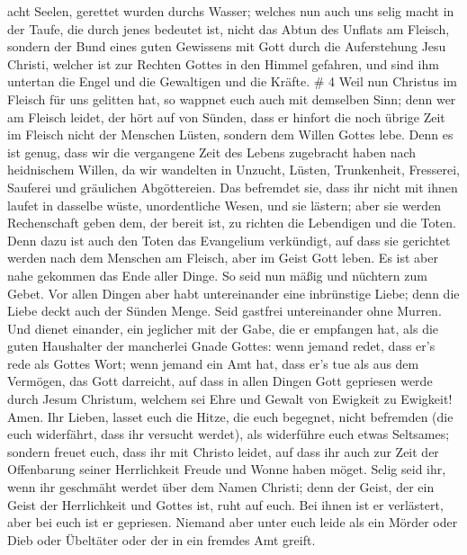 acht Seelen, gerettet wurden durchs Wasser;  welches nun
auch uns selig macht in der Taufe, die durch jenes bedeutet ist, nicht
das Abtun des Unflats am Fleisch, sondern der Bund eines guten Gewissens
mit Gott durch die Auferstehung Jesu Christi,  welcher ist
zur Rechten Gottes in den Himmel gefahren, und sind ihm untertan die
Engel und die Gewaltigen und die Kräfte. \# 4  Weil nun
Christus im Fleisch für uns gelitten hat, so wappnet euch auch mit
demselben Sinn; denn wer am Fleisch leidet, der hört auf von Sünden,
 dass er hinfort die noch übrige Zeit im Fleisch nicht der
Menschen Lüsten, sondern dem Willen Gottes lebe.  Denn es
ist genug, dass wir die vergangene Zeit des Lebens zugebracht haben nach
heidnischem Willen, da wir wandelten in Unzucht, Lüsten, Trunkenheit,
Fresserei, Sauferei und gräulichen Abgöttereien.  Das
befremdet sie, dass ihr nicht mit ihnen laufet in dasselbe wüste,
unordentliche Wesen, und sie lästern;  aber sie werden
Rechenschaft geben dem, der bereit ist, zu richten die Lebendigen und
die Toten.  Denn dazu ist auch den Toten das Evangelium
verkündigt, auf dass sie gerichtet werden nach dem Menschen am Fleisch,
aber im Geist Gott leben.  Es ist aber nahe gekommen das
Ende aller Dinge.  So seid nun mäßig und nüchtern zum Gebet.
Vor allen Dingen aber habt untereinander eine inbrünstige Liebe; denn
die Liebe deckt auch der Sünden Menge.  Seid gastfrei
untereinander ohne Murren.  Und dienet einander, ein
jeglicher mit der Gabe, die er empfangen hat, als die guten Haushalter
der mancherlei Gnade Gottes:  wenn jemand redet, dass er's
rede als Gottes Wort; wenn jemand ein Amt hat, dass er's tue als aus dem
Vermögen, das Gott darreicht, auf dass in allen Dingen Gott gepriesen
werde durch Jesum Christum, welchem sei Ehre und Gewalt von Ewigkeit zu
Ewigkeit! Amen.  Ihr Lieben, lasset euch die Hitze, die
euch begegnet, nicht befremden (die euch widerfährt, dass ihr versucht
werdet), als widerführe euch etwas Seltsames;  sondern
freuet euch, dass ihr mit Christo leidet, auf dass ihr auch zur Zeit der
Offenbarung seiner Herrlichkeit Freude und Wonne haben möget.
 Selig seid ihr, wenn ihr geschmäht werdet über dem Namen
Christi; denn der Geist, der ein Geist der Herrlichkeit und Gottes ist,
ruht auf euch. Bei ihnen ist er verlästert, aber bei euch ist er
gepriesen.  Niemand aber unter euch leide als ein Mörder
oder Dieb oder Übeltäter oder der in ein fremdes Amt greift.
